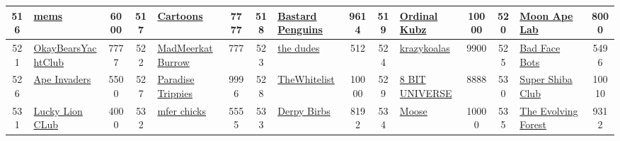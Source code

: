 \begin{table*}[]
{\begin{tabular}{|c|l|c|c|l|c|c|l|c|c|l|c|c|l|c|}
        516   & \href{https://memsproject.xyz/}{mems}                                              & 6000              & 517   & \href{https://cartoons.io}{Cartoons}                                                              & 7777              & 518   & \href{https://bastardpenguins.club/}{Bastard Penguins}                            & 9614              & 519   & \href{https://keungz.com}{Ordinal Kubz}                                       & 10000             & 520   & \href{https://moonapelab.io}{Moon Ape Lab}                                                & 8000                                    \\ \hline
        521   & \href{https://obyclabs.com}{OkayBearsYachtClub}                                    & 7777              & 522   & \href{https://madmeerkat.io/}{MadMeerkatBurrow}                                                   & 777               & 523   & \href{https://int.art}{the dudes}                                                 & 512               & 524   & \href{https://krazykoalas.io/}{krazykoalas}                                   & 9900              & 525   & \href{https://badfacebots.com}{Bad Face Bots}                                             & 5496                                    \\ \hline
        526   & \href{https://opensea.io/collection/apeinvaders}{Ape Invaders}                     & 5500              & 527   & \href{https://trippies.com}{Paradise Trippies}                                                    & 9996              & 528   & \href{https://thewhitelist.io}{TheWhitelist}                                      & 10000             & 529   & \href{https://8bituniverse.io}{8 BIT UNIVERSE}                                & 8888              & 530   & \href{https://twitter.com/supershibaclub}{Super Shiba Club}                               & 10010                                   \\ \hline
        531   & \href{https://luckylionclubnft.com}{Lucky Lion CLub}                               & 4000              & 532   & \href{https://mirror.xyz/sartoshi.eth/QukjtL1076-1SEoNJuqyc-x4Ut2v8\_TocKkszo-S\_nU}{mfer chicks} & 5555              & 533   & \href{http://www.derpybirbs.com}{Derpy Birbs}                                     & 8192              & 534   & \href{https://app.moosetrax.art/}{Moose}                                      & 10000             & 535   & \href{https://evolvingforest.io/}{The Evolving Forest}                                    & 9312                                    \\ \hline

\end{tabular}}
\end{table*}
